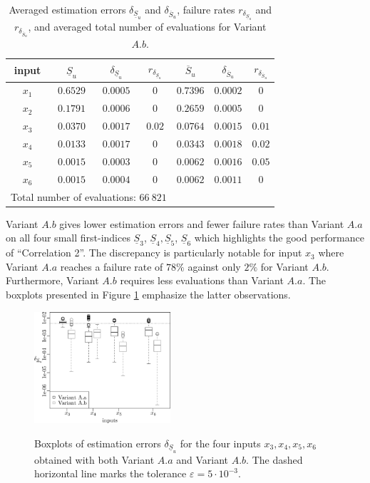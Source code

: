 \begin{table}[t]
\caption{Averaged estimation errors $\delta_{\underline{S}_u}$ and $\delta_{\overline{S}_u}$, failure rates $r_{\delta_{\underline{S}_u}}$ and $r_{\delta_{\overline{S}_u}}$, and averaged total number of evaluations for Variant $A.b$.}
\centering
\begin{tabular}{ccccccc}
\hline
 input & $\underline{S}_u$ & $\delta_{\underline{S}_u}$ & $r_{\delta_{\underline{S}_u}}$ & $\overline{S}_u$ & $\delta_{\overline{S}_u}$ & $r_{\delta_{\overline{S}_u}}$ \\ \hline
 $x_1$ & $0.6529$ &  $0.0005$ & $0$ & $0.7396$ & $0.0002$ & $0$ \\ \hline
 $x_2$ & $0.1791$ &  $0.0006$ & $0$ & $0.2659$ & $0.0005$ & $0$ \\ \hline
 $x_3$ & $0.0370$ &  $0.0017$ & $0.02$ & $0.0764$ & $0.0015$ & $0.01$ \\ \hline
 $x_4$ & $0.0133$ &  $0.0017$ & $0$ & $0.0343$ & $0.0018$ & $0.02$ \\ \hline
 $x_5$ & $0.0015$ &  $0.0003$ & $0$ & $0.0062$ & $0.0016$ & $0.05$ \\ \hline
 $x_6$ & $0.0015$ &  $0.0004$ & $0$  & $0.0062$ & $0.0011$ & $0$ \\ \hline \hline
\multicolumn{4}{l}{Total number of evaluations: $66 \ 821$} & & &\\ \hline 
\end{tabular}
\label{res.bratley.Ab}
\end{table}

Variant $A.b$ gives lower estimation errors and fewer failure rates than Variant $A.a$ on all four small first-indices $\underline{S}_3$, $\underline{S}_4,\underline{S}_5$, $\underline{S}_6$ which highlights the good performance of ``Correlation 2''. The discrepancy is particularly notable for input $x_3$ where Variant $A.a$ reaches a failure rate of $78\%$ against only $2\%$ for Variant $A.b$. Furthermore, Variant $A.b$ requires less evaluations than Variant $A.a$. The boxplots presented in Figure \ref{boxplots.bratley} emphasize the latter observations.
\begin{figure}[t]
\caption{Boxplots of estimation errors $\delta_{\underline{S}_u}$ for the four inputs $x_3,x_4,x_5,x_6$ obtained with both Variant $A.a$ and Variant $A.b$. The dashed horizontal line marks the tolerance $\varepsilon=5\cdot 10^{-3}$.}
\vspace*{0.2cm}
\centering
\includegraphics[width=0.45\textwidth]{bratley_box.eps}
\label{boxplots.bratley}
\end{figure}


